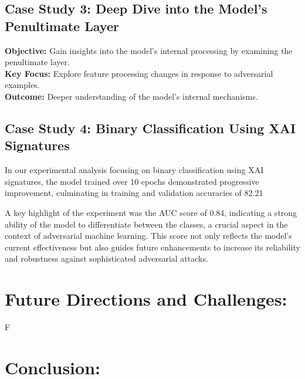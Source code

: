 \documentclass[10pt, conference, a4paper, final]{IEEEtran}
\begin{document}
    \subsection{Case Study 3: Deep Dive into the Model's Penultimate Layer}
\textbf{Objective:} Gain insights into the model's internal processing by examining the penultimate layer. \\
\textbf{Key Focus:} Explore feature processing changes in response to adversarial examples. \\
\textbf{Outcome:} Deeper understanding of the model's internal mechanisms.

\subsection{Case Study 4: Binary Classification Using XAI Signatures}

In our experimental analysis focusing on binary classification using XAI signatures, the model trained over 10 epochs demonstrated progressive improvement, culminating in training and validation accuracies of 82.21%

A key highlight of the experiment was the AUC score of 0.84, indicating a strong ability of the model to differentiate between the classes, a crucial aspect in the context of adversarial machine learning. This score not only reflects the model's current effectiveness but also guides future enhancements to increase its reliability and robustness against sophisticated adversarial attacks.

\section{Future Directions and Challenges:}

F\section{Conclusion:}
\end{document}
